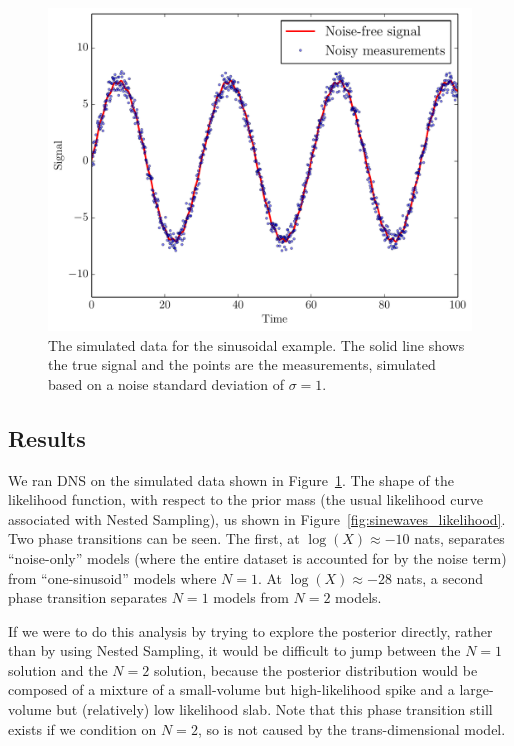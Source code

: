 \documentclass[letterpaper, 11pt]{article}
\begin{document}
\begin{figure}
\begin{center}
\includegraphics[scale=0.5]{sinewave_data.pdf}
\caption{The simulated data for the sinusoidal example. The solid line shows
the true signal and the points are the measurements, simulated based on a
noise standard deviation of $\sigma = 1$.
\label{fig:sinewave_data}}
\end{center}
\end{figure}

\subsection{Results}
We ran DNS on the simulated data shown in Figure~\ref{fig:sinewave_data}.
The shape of the likelihood function, with respect to the prior mass (the
usual likelihood curve associated with Nested Sampling), us shown in
Figure~\ref{fig:sinewaves_likelihood}. Two phase transitions can be seen. The
first, at $\log(X) \approx -10$ nats,
separates ``noise-only'' models (where the
entire dataset is accounted for by the noise term) from ``one-sinusoid'' models
where $N=1$. At $\log(X) \approx -28$ nats, a second phase transition separates
$N=1$ models from $N=2$ models.

If we were to do this analysis by trying to explore the posterior directly,
rather than by using Nested Sampling, it would be difficult to jump between
the $N=1$ solution and the $N=2$ solution, because the posterior distribution
would be composed of a mixture of a small-volume but high-likelihood spike
and a large-volume but (relatively) low likelihood
slab. Note that this phase transition still exists if we condition on $N=2$,
so is not caused by the trans-dimensional model.
\end{document}
